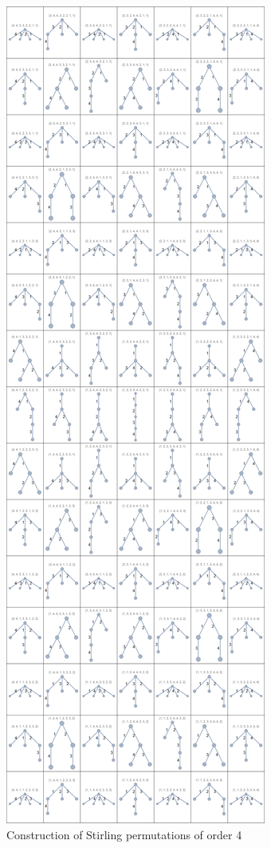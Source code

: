 \documentclass[12pt]{article}
\numberwithin{equation}{section}
\begin{document}
\begin{figure}[!htb]
    \centering
    \includegraphics[height=\textheight]{Images/neweulertours.png}
    \caption{Construction of Stirling permutations of order 4}
    \label{fig:stirling4graph}
\end{figure}
\clearpage
\end{document}
